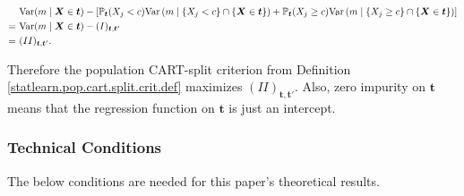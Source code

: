 \begin{align*}
& \mathrm{Var}(m \mid \boldsymbol{X} \in \boldsymbol{t}) - \left[ \mathbb{P}_{\boldsymbol{t}}(X_j < c) \mathrm{Var} \left(m \mid \{X_j < c \} \cap \{\boldsymbol{X} \in \boldsymbol{t}\} \right) +  \mathbb{P}_{\boldsymbol{t}}(X_j \geq c) \mathrm{Var} \left(m \mid \{X_j \geq c \} \cap \{\boldsymbol{X} \in \boldsymbol{t}\} \right) \right]
\\ = ~& \mathrm{Var}(m \mid \boldsymbol{X} \in \boldsymbol{t}) - (I)_{\boldsymbol{t}, \boldsymbol{t}'} 
\\ =~ & (II)_{\boldsymbol{t}, \boldsymbol{t}'}.
\end{align*}

Therefore the population CART-split criterion from Definition \ref{statlearn.pop.cart.split.crit.def} maximizes \((II)_{\boldsymbol{t}, \boldsymbol{t}'}\). Also, zero impurity on \(\boldsymbol{t}\) means that the regression function on \(\boldsymbol{t}\) is just an intercept.

\subsubsection{Technical Conditions}

The below conditions are needed for this paper's theoretical results.

